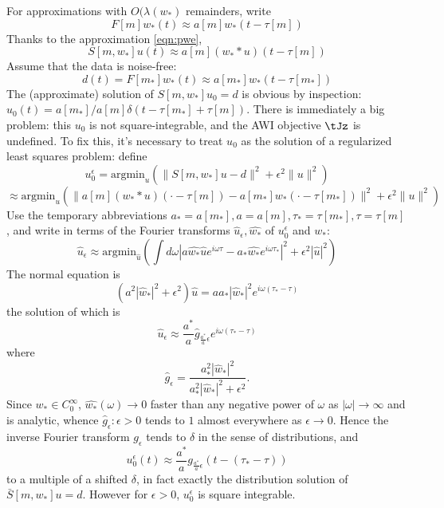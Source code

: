 For approximations with $O(\lambda(w_*)$ remainders, write
\begin{equation}
  \label{eqn:pwe}
  F[m]w_*(t) \approx a[m]w_*(t-\tau[m])
\end{equation}
Thanks to the approximation \ref{eqn:pwe},
\begin{equation}
  \label{eqn:spwe}
S[m,w_*]u(t) \approx a[m](w_**u)(t-\tau[m])
\end{equation}
Assume that the data is noise-free:
$$
d(t)=F[m_*]w_*(t) \approx a[m_*]w_*(t-\tau[m_*])
$$
The (approximate) solution of $S[m,w_*]u_0=d$ is obvious by inspection: $u_0(t) = a[m_*]/a[m]\delta(t-\tau[m_*]+\tau[m])$. There is immediately a big problem: this $u_0$ is not square-integrable, and the AWI objective $\tJz$ is undefined. To fix this, it's necessary to treat $u_0$ as the solution of a regularized least squares problem: define
$$
u_0^{\epsilon} = \mbox{argmin}_u (\|S[m,w_*]u-d\|^2 + \epsilon^2\|u\|^2)
$$
$$
\approx \mbox{argmin}_u (\|a[m](w_**u)(\cdot-\tau[m])-a[m_*]w_*(\cdot-\tau[m_*])\|^2 + \epsilon^2\|u\|^2)
$$
Use the temporary abbreviations $a_*=a[m_*], a=a[m], \tau_*=\tau[m_*], \tau=\tau[m]$, and write in terms of the Fourier transforms $\hat{u}_{\epsilon},\hat{w_*}$ of $u_0^{\epsilon}$ and $w_*$:
$$
\hat{u}_{\epsilon} \approx \mbox{argmin}_{\hat{u}}\left(\int d\omega |a\hat{w_*}\hat{u}e^{i\omega \tau}-a_*\hat{w_*}e^{i\omega\tau_*}|^2 + \epsilon^2 |\hat{u}|^2\right)
$$
The normal equation is
$$
(a^2 |\hat{w}_*|^2 +\epsilon^2)\hat{u} = a a_*|\hat{w}_*|^2e^{i\omega(\tau_*-\tau)}
$$
the solution of which is
$$
\hat{u}_{\epsilon} \approx \frac{a^*}{a}\hat{g}_{\frac{a^*}{a}\epsilon} e^{i\omega(\tau_*-\tau)}
$$
where
$$ 
\hat{g}_{\epsilon} = \frac{a_*^2|\hat{w}_*|^2}{a_*^2|\hat{w}_*|^2 + \epsilon^2}.
$$
Since $w_* \in C_0^{\infty}$, $\hat{w_*}(\omega) \rightarrow 0$ faster than any negative power of $\omega$ as $|\omega| \rightarrow \infty$ and is analytic, whence $\hat{g}_{\epsilon}: \epsilon > 0$ tends to $1$ almost everywhere as $\epsilon \rightarrow 0$. Hence the inverse Fourier transform $g_{\epsilon}$ tends to $\delta$ in the sense of distributions, and 
$$
u_0^{\epsilon}(t) \approx \frac{a^*}{a}g_{\frac{a^*}{a}\epsilon}(t-(\tau_*-\tau))
$$
to a multiple of a shifted $\delta$, in fact exactly the distribution solution of $\bar{S}[m,w_*]u=d$. However for $\epsilon>0$, $u_0^{\epsilon}$ is square integrable.

